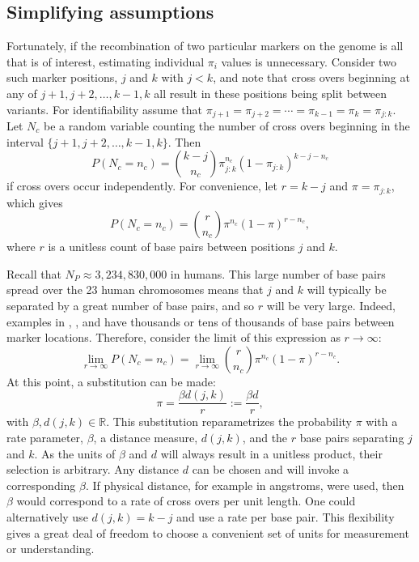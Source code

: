 \documentclass[12pt]{article}
\newcommand{\field}[1]{\mathbb{#1}}
\newcommand{\Reals}{\field{R}}
\begin{document}
\subsection{Simplifying assumptions} \label{subsec:simplify}

Fortunately, if the recombination of two particular markers on the genome is all that is of interest, estimating individual $\pi_i$ values is unnecessary. Consider two such marker positions, $j$ and $k$ with $j < k$, and note that cross overs beginning at any of $j+1, j+2, \dots, k-1, k$ all result in these positions being split between variants. For identifiability assume that $\pi_{j+1} = \pi_{j+2} = \cdots = \pi_{k-1} = \pi_k = \pi_{j:k}$. Let $N_c$ be a random variable counting the number of cross overs beginning in the interval $\{j+1,j+2,\dots,k-1,k\}$. Then
$$P(N_c = n_c) = {k - j \choose n_c} \pi_{j:k}^{n_c} (1-\pi_{j:k})^{k - j - n_c}$$
if cross overs occur independently. For convenience, let $r = k - j$ and $\pi = \pi_{j:k}$, which gives
\begin{equation} \label{eq:binomialDist}
  P(N_c = n_c) = {r \choose n_c} \pi^{n_c} (1-\pi)^{r - n_c},
\end{equation}
where $r$ is a unitless count of base pairs between positions $j$ and $k$.

Recall that $N_P \approx 3,234,830,000$ in humans. This large number of base pairs spread over the 23 human chromosomes means that $j$ and $k$ will typically be separated by a great number of base pairs, and so $r$ will be very large. Indeed, examples in \cite{nyholt2004}, \cite{Salyakina2005}, and \cite{Galwey2009} have thousands or tens of thousands of base pairs between marker locations. Therefore, consider the limit of this expression as $r \rightarrow \infty$:
$$\lim_{r \rightarrow \infty} P(N_c = n_c) = \lim_{r \rightarrow \infty} {r \choose n_c} \pi^{n_c} (1-\pi)^{r - n_c}.$$
At this point, a substitution can be made:
$$\pi = \frac{\beta d(j,k)}{r} := \frac{\beta d}{r},$$
with $\beta, d(j,k) \in \Reals$. This substitution reparametrizes the probability $\pi$ with a rate parameter, $\beta$, a distance measure, $d(j,k)$, and the $r$ base pairs separating $j$ and $k$. As the units of $\beta$ and $d$ will always result in a unitless product, their selection is arbitrary. Any distance $d$ can be chosen and will invoke a corresponding $\beta$. If physical distance, for example in angstroms, were used, then $\beta$ would correspond to a rate of cross overs per unit length. One could alternatively use $d(j,k)=k-j$ and use a rate per base pair. This flexibility gives a great deal of freedom to choose a convenient set of units for measurement or understanding.
\end{document}
